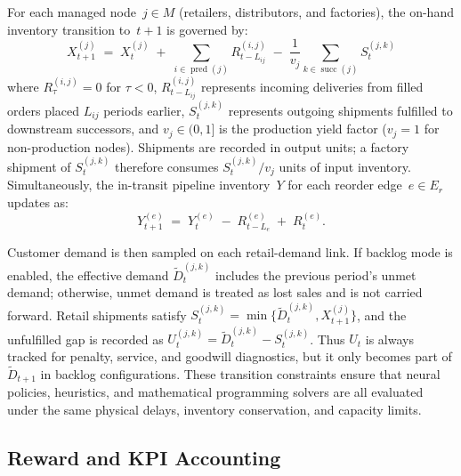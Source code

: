 \documentclass[10pt,a4paper]{article}
\begin{document}
For each managed node~$j \in M$ (retailers, distributors, and factories), the
on-hand inventory transition to~$t{+}1$ is governed by:
\begin{equation}\label{eq:material_balance}
  X_{t+1}^{(j)} \;=\; X_t^{(j)}
    \;+\; \sum_{i \in \operatorname{pred}(j)} R_{t-L_{ij}}^{(i,j)}
    \;-\; \frac{1}{v_j}
           \sum_{k \in \operatorname{succ}(j)} S_t^{(j,k)}
\end{equation}
where $R_{\tau}^{(i,j)}=0$ for $\tau<0$,
$R_{t-L_{ij}}^{(i,j)}$ represents incoming deliveries from filled orders placed
$L_{ij}$ periods earlier, $S_t^{(j,k)}$ represents outgoing shipments fulfilled
to downstream successors, and $v_j \in (0,1]$ is the production yield factor
($v_j=1$ for non-production nodes). Shipments are recorded in output units; a
factory shipment of $S_t^{(j,k)}$ therefore consumes $S_t^{(j,k)}/v_j$ units of
input inventory. Simultaneously, the in-transit pipeline inventory~$Y$ for each
reorder edge~$e \in E_r$ updates as:
\begin{equation}\label{eq:pipeline}
  Y_{t+1}^{(e)} \;=\; Y_t^{(e)} \;-\; R_{t-L_e}^{(e)}
                  \;+\; R_t^{(e)} .
\end{equation}

Customer demand is then sampled on each retail-demand link. If backlog mode is
enabled, the effective demand $\widetilde D_t^{(j,k)}$ includes the previous
period's unmet demand; otherwise, unmet demand is treated as lost sales and is
not carried forward. Retail shipments satisfy
$S_t^{(j,k)}=\min\{\widetilde D_t^{(j,k)},X_{t+1}^{(j)}\}$, and the unfulfilled
gap is recorded as
$U_t^{(j,k)}=\widetilde D_t^{(j,k)}-S_t^{(j,k)}$. Thus $U_t$ is always tracked
for penalty, service, and goodwill diagnostics, but it only becomes part of
$\widetilde D_{t+1}$ in backlog configurations. These transition constraints
ensure that neural policies, heuristics, and mathematical programming solvers
are all evaluated under the same physical delays, inventory conservation, and
capacity limits.

\subsection{Reward and KPI Accounting}
\end{document}
